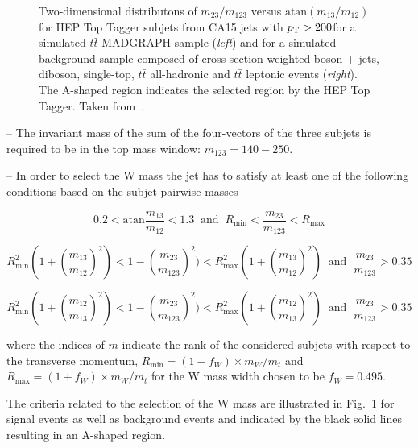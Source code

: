 \begin{description}
\begin{figure}[!tp]
\begin{tabular}{cc}
  \end{tabular}
  \caption{Two-dimensional distributons of $m_{\mathrm{23}}/m_{\mathrm{123}}$ versus $\mathrm{atan}(m_{\mathrm{13}}/m_{\mathrm{12}})$ for HEP Top Tagger subjets from CA15 jets with $p_{\text{T}} > 200$\gev for a simulated $t\bar{t}$ MADGRAPH sample (\textit{left}) and for a simulated background sample composed of cross-section weighted boson + jets, diboson, single-top, $t\bar{t}$ all-hadronic and $t\bar{t}$ leptonic events (\textit{right}). The A-shaped region indicates the selected region by the HEP Top Tagger. Taken from~\cite{CMS:2014fya}.}
  \label{fig:boosted_top_hep_variables}
\end{figure}
\begin{description}
 \item -- The invariant mass of the sum of the four-vectors of the three subjets is required to be in the top mass window: $m_{\mathrm{123}} = 140 - 250$\gev.
 \item -- In order to select the W mass the jet has to satisfy at least one of the following conditions based on the subjet pairwise masses
\begin{description}
 \item \begin{equation}
0.2 < \mathrm{atan} \frac{m_{\mathrm{13}}}{m_{\mathrm{12}}} < 1.3 \; \; \mathrm{and} \; \; R_{\mathrm{min}} < \frac{m_{\mathrm{23}}}{m_{\mathrm{123}}} < R_{\mathrm{max}}
\label{eq:hep_1}
\end{equation}
 \item \begin{equation}
R^2_{\mathrm{min}}(1+(\frac{m_{\mathrm{13}}}{m_{\mathrm{12}}})^2) < 1 - (\frac{m_{\mathrm{23}}}{m_{\mathrm{123}}})^2) < R^2_{\mathrm{max}}(1+(\frac{m_{\mathrm{13}}}{m_{\mathrm{12}}})^2) \; \; \mathrm{and} \; \; \frac{m_{\mathrm{23}}}{m_{\mathrm{123}}} > 0.35
\label{eq:hep_2}
\end{equation}
 \item \begin{equation}
R^2_{\mathrm{min}}(1+(\frac{m_{\mathrm{12}}}{m_{\mathrm{13}}})^2) < 1 - (\frac{m_{\mathrm{23}}}{m_{\mathrm{123}}})^2) < R^2_{\mathrm{max}}(1+(\frac{m_{\mathrm{12}}}{m_{\mathrm{13}}})^2) \; \; \mathrm{and} \; \; \frac{m_{\mathrm{23}}}{m_{\mathrm{123}}} > 0.35
\label{eq:hep_3}
\end{equation}
\end{description}
where the indices of $m$ indicate the rank of the considered subjets with respect to the transverse momentum, $R_{\mathrm{min}} = (1 - f_{W}) \times m_W/m_t$ and $R_{\mathrm{max}} = (1 + f_{W}) \times m_W/m_t$ for the W mass width chosen to be $f_W = 0.495$.  
\end{description}
The criteria related to the selection of the W mass are illustrated in Fig.~\ref{fig:boosted_top_hep_variables} for signal events as well as background events and indicated by the black solid lines resulting in an A-shaped region.
\end{description}
